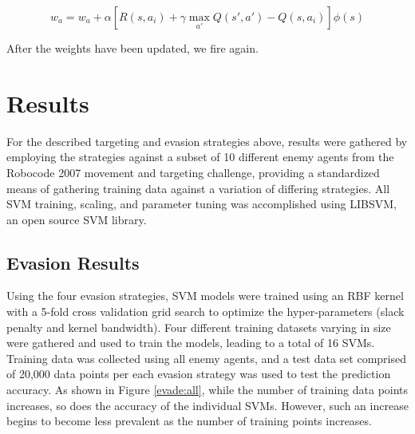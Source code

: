 \documentclass{article}
\theoremstyle{plain}
\theoremstyle{definition}
\theoremstyle{remark}
\begin{document}
$$w_a = w_a + \alpha\left[R(s, a_i) + \gamma\max_{a'}Q(s', a') - Q(s, a_i)\right]\phi(s)$$

After the weights have been updated, we fire again.

\section{Results}

For the described targeting and evasion strategies above, results were gathered by employing the strategies against a subset of 10 different enemy agents from the Robocode 2007 movement and targeting challenge, providing a standardized means of gathering training data against a variation of differing strategies. All SVM training, scaling, and parameter tuning was accomplished using LIBSVM, an open source SVM library\cite{libsvm}.

\subsection*{Evasion Results}
Using the four evasion strategies, SVM models were trained using an RBF kernel with a 5-fold cross validation grid search to optimize the hyper-parameters (slack penalty and kernel bandwidth). Four different training datasets varying in size were gathered and used to train the models, leading to a total of 16 SVMs. Training data was collected using all enemy agents, and a test data set comprised of 20,000 data points per each evasion strategy was used to test the prediction accuracy. As shown in Figure \ref{evade:all}, while the number of training data points increases, so does the accuracy of the individual SVMs. However, such an increase begins to become less prevalent as the number of training points increases.
\end{document}
